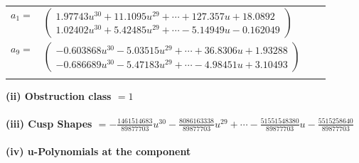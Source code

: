 \documentclass[1p]{elsarticle_modified}
\theoremstyle{definition}
\begin{document}
\begin{tabular}{m{7pt} m{180pt} m{7pt} m{180pt} }
\flushright $a_{1}=$&$\begin{pmatrix}1.97743 u^{30}+11.1095 u^{29}+\cdots+127.357 u+18.0892\\1.02402 u^{30}+5.42485 u^{29}+\cdots-5.14949 u-0.162049\end{pmatrix}$ \\
\flushright $a_{9}=$&$\begin{pmatrix}-0.603868 u^{30}-5.03515 u^{29}+\cdots+36.8306 u+1.93288\\-0.686689 u^{30}-5.47183 u^{29}+\cdots-4.98451 u+3.10493\end{pmatrix}$\\&\end{tabular}
\flushleft \textbf{(ii) Obstruction class $= 1$}\\~\\
\flushleft \textbf{(iii) Cusp Shapes $= -\frac{1461514683}{89877703} u^{30}-\frac{8086163338}{89877703} u^{29}+\cdots-\frac{51551548380}{89877703} u-\frac{5515258640}{89877703}$}\\~\\
\newpage\renewcommand{\arraystretch}{1}
\flushleft \textbf{(iv) u-Polynomials at the component}\newline \\
\end{document}
